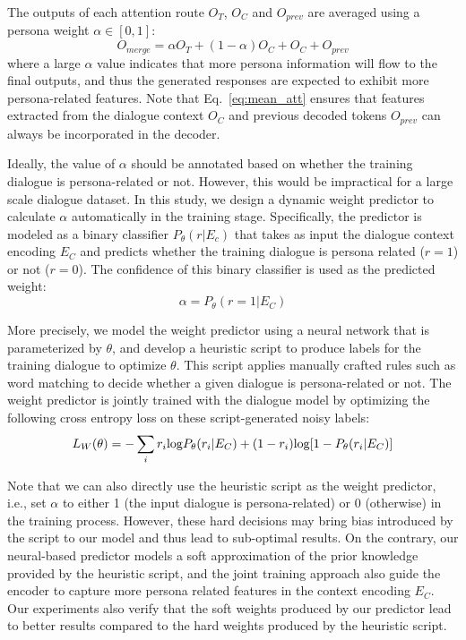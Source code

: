 \documentclass[letterpaper]{article}
\begin{document}
The outputs of each attention route $O_T$, $O_C$ and $O_{prev}$ are averaged using a persona weight $\alpha \in [0, 1]$:
\begin{equation}\label{eq:mean_att}
    O_{merge} = \alpha O_T + (1- \alpha)O_C + O_C + O_{prev}
\end{equation}
where a large $\alpha$ value indicates that more persona information will flow to the final outputs, and thus the generated responses are expected to exhibit more persona-related features. Note that Eq.~\ref{eq:mean_att} ensures that features extracted from the dialogue context $O_C$ and previous decoded tokens $O_{prev}$ can always be incorporated in the decoder.

Ideally, the value of $\alpha$ should be annotated based on whether the training dialogue is persona-related or not. However, this would be impractical for a large scale dialogue dataset. In this study, we design a dynamic weight predictor to calculate $\alpha$ automatically in the training stage. Specifically, the predictor is modeled as a binary classifier $P_\theta(r|E_c)$ that takes as input the dialogue context encoding $E_C$ and predicts whether the training dialogue is persona related ($r=1$) or not ($r=0$). The confidence of this binary classifier is used as the predicted weight:
\begin{equation}
    \alpha = P_\theta(r=1| E_C)
\end{equation}

More precisely, we model the weight predictor using a neural network that is parameterized by $\theta$, and develop a heuristic script to produce labels for the training dialogue to optimize $\theta$. This script applies manually crafted rules such as word matching to decide whether a given dialogue is persona-related or not. The weight predictor is jointly trained with the dialogue model by optimizing the following cross entropy loss on these script-generated noisy labels:
\begin{equation*}
    L_{W}(\theta) = -\sum_i r_i{\rm log}P_\theta(r_i | E_C) + (1 - r_i){\rm log}[1 - P_\theta(r_i | E_C)]
\end{equation*}

Note that we can also directly use the heuristic script as the weight predictor, i.e., set $\alpha$ to either 1 (the input dialogue is persona-related) or 0 (otherwise) in the training process. However, these hard decisions may bring bias introduced by the script to our model and thus lead to sub-optimal results. On the contrary, our neural-based predictor models a soft approximation of the prior knowledge provided by the heuristic script, and the joint training approach also guide the encoder to capture more persona related features in the context encoding $E_C$. Our experiments also verify that the soft weights produced by our predictor lead to better results compared to the hard weights produced by the heuristic script.
\end{document}
